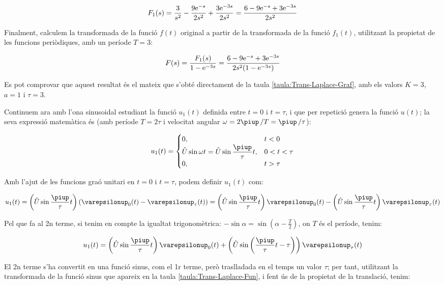 \begin{exemple}[\CalcTransfLaplace{}]
    \[
        F_1(s) = \frac{3}{s^2} - \frac{9 \mathrm{e}^{-s}}{2 s^2} + \frac{3 \mathrm{e}^{-3s}}{2
        s^2} =\frac{6-9\mathrm{e}^{-s}+3\mathrm{e}^{-3s}}{2s^2}
    \]

    Finalment, calculem la transformada de la funció $f(t)$ original a
    partir de la transformada de la funció $f_1(t)$, utilitzant la
    propietat de les funcions periòdiques, amb un període $T=3$:

    \[
        F(s) = \frac{F_1(s)}{1-\mathrm{e}^{-3s}} = \frac{6-9\mathrm{e}^{-s}+3\mathrm{e}^{-3s}}{2s^2(1-\mathrm{e}^{-3s}) }
    \]

    Es pot comprovar que aquest resultat és el mateix que s'obté directament de la taula \vref{taula:Trans-Laplace-Graf}, amb els valors $K=3$, $a=1$ i $\tau=3$.

    Continuem ara  amb l'ona sinusoidal estudiant la funció $u_1(t)$
    definida entre $t=0$ i $t=\tau$, i que per repetició genera la
    funció $u(t)$; la seva expressió matemàtica és (amb període $T=
    2\tau$ i velocitat angular $\omega= 2\piup\,/T  = \piup\,/\tau$):

    \[
        u_1(t) = \begin{cases} 0, & t < 0\\ \hat{U}\sin\omega t =
        \hat{U}\sin\dfrac{\piup}{\tau}t,  & 0<t<\tau \\ 0, & t > \tau \end{cases}
    \]


    Amb l'ajut de les funcions graó unitari en $t=0$ i $t=\tau$, podem
    definir $u_1(t)$ com:

    \[
        u_1(t)=\left(\hat{U}\sin\frac{\piup}{\tau}t\right)(\varepsilonup_0(t)-\varepsilonup_\tau(t))
        =\left(\hat{U}\sin\frac{\piup}{\tau}t\right)\varepsilonup_0(t) - \left(\hat{U}\sin\frac{\piup}{\tau}t\right)\varepsilonup_\tau(t)
    \]

    Pel que fa al 2n  terme, si tenim en compte la igualtat
    trigonomètrica: $-\sin \alpha = \sin(\alpha-\frac{T}{2})$, on $T$ és
    el període, tenim:

    \[
        u_1(t) = \left(\hat{U}\sin\frac{\piup}{\tau}t\right)\varepsilonup_0(t) +
        \left(\hat{U}\sin\left(\frac{\piup}{\tau}t-\tau\right)\right)\varepsilonup_\tau(t)
    \]

    El 2n terme s'ha convertit en una funció sinus, com el 1r terme,
    però traslladada en el temps un valor $\tau$; per tant, utilitzant la
    transformada de la funció sinus que apareix en la taula
    \vref{taula:Trans-Laplace-Fun}, i fent ús de la propietat de la
    translació, tenim:


\end{exemple}
